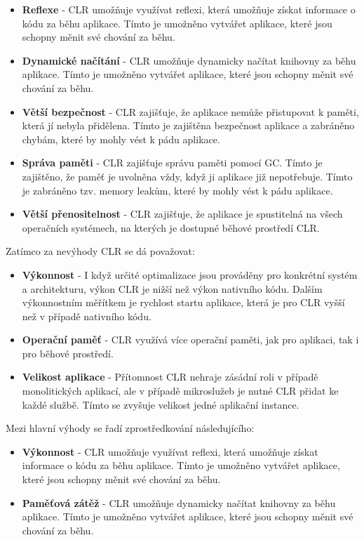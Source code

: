 \begin{itemize}
    \item  \textbf{Reflexe} - CLR umožňuje využívat reflexi, která umožňuje získat informace o kódu za běhu aplikace. Tímto je umožněno vytvářet aplikace, které jsou schopny měnit své chování za běhu.
    \item \textbf{Dynamické načítání} - CLR umožňuje dynamicky načítat knihovny za běhu aplikace. Tímto je umožněno vytvářet aplikace, které jsou schopny měnit své chování za běhu.
    \item \textbf{Větší bezpečnost} - CLR zajišťuje, že aplikace nemůže přistupovat k paměti, která jí nebyla přidělena. Tímto je zajištěna bezpečnost aplikace a zabráněno chybám, které by mohly vést k pádu aplikace.
    \item \textbf{Správa paměti} - CLR zajišťuje správu paměti pomocí GC. Tímto je zajištěno, že paměť je uvolněna vždy, když ji aplikace již nepotřebuje. Tímto je zabráněno tzv. memory leakům, které by mohly vést k pádu aplikace.
    \item \textbf{Větší přenositelnost} - CLR zajišťuje, že aplikace je spustitelná na všech operačních systémech, na kterých je dostupné běhové prostředí CLR.
\end{itemize}


Zatímco za nevýhody CLR se dá považovat:

\begin{itemize}
    \item  \textbf{Výkonnost} - I když určité optimalizace jsou prováděny pro konkrétní systém a architekturu, výkon CLR je nižší než výkon nativního kódu. Dalším výkonnostním měřítkem je rychlost startu aplikace, která je pro CLR vyšší než v případě nativního kódu.
    \item \textbf{Operační paměť} - CLR využívá více operační paměti, jak pro aplikaci, tak i pro běhové prostředí.
    \item \textbf{Velikost aplikace} - Přítomnost CLR nehraje zásádní roli v případě monolitických aplikací, ale v případě mikroslužeb je nutné CLR přidat ke každé službě. Tímto se zvyšuje velikost jedné aplikační instance.
\end{itemize}



Mezi hlavní výhody se řadí zprostředkování následujícího:

\begin{itemize}
    \item  \textbf{Výkonnost} - CLR umožňuje využívat reflexi, která umožňuje získat informace o kódu za běhu aplikace. Tímto je umožněno vytvářet aplikace, které jsou schopny měnit své chování za běhu.
    \item \textbf{Paměťová zátěž} - CLR umožňuje dynamicky načítat knihovny za běhu aplikace. Tímto je umožněno vytvářet aplikace, které jsou schopny měnit své chování za běhu.
\end{itemize}

